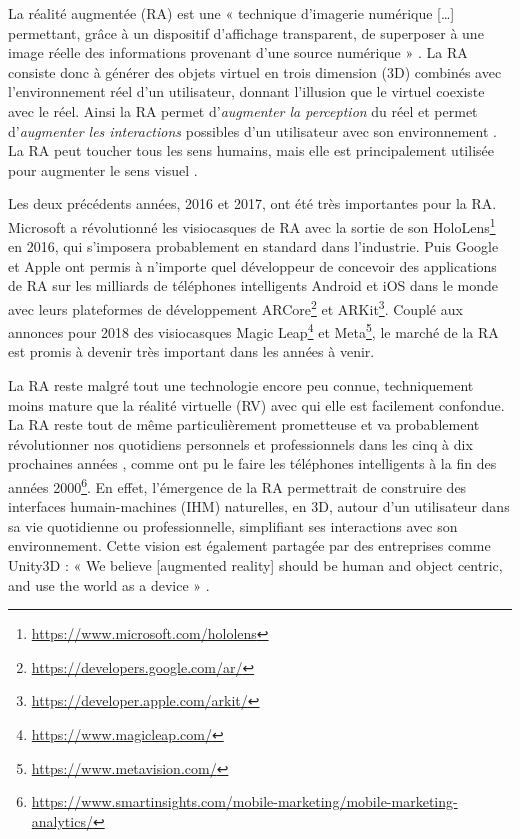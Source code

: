 La réalité augmentée (RA) est une « technique d'imagerie numérique […] permettant, grâce à un dispositif d'affichage transparent, de superposer à une image réelle des informations provenant d'une source numérique » \citep{OfficeQuebecoisLangueFrancaiseRA2015}. La RA consiste donc à générer des objets virtuel en trois dimension (3D) combinés avec l'environnement réel d'un utilisateur, donnant l'illusion que le virtuel coexiste avec le réel. Ainsi la RA permet d'\emph{augmenter la perception} du réel et permet d'\emph{augmenter les interactions} possibles d'un utilisateur avec son environnement \citep{Azuma1997}. La RA peut toucher tous les sens humains, mais elle est principalement utilisée pour augmenter le sens visuel .

Les deux précédents années, 2016 et 2017, ont été très importantes pour la RA. Microsoft a révolutionné les visiocasques de RA avec la sortie de son HoloLens\footnote{\url{https://www.microsoft.com/hololens}} en 2016, qui s'imposera probablement en standard dans l'industrie. Puis Google et Apple ont permis à n'importe quel développeur de concevoir des applications de RA sur les milliards de téléphones intelligents Android et iOS dans le monde avec leurs plateformes de développement ARCore\footnote{\url{https://developers.google.com/ar/}} et ARKit\footnote{\url{https://developer.apple.com/arkit/}}. Couplé aux annonces pour 2018 des visiocasques Magic Leap\footnote{\url{https://www.magicleap.com/}} et Meta\footnote{\url{https://www.metavision.com/}}, le marché de la RA est promis à devenir très important dans les années à venir.


La RA reste malgré tout une technologie encore peu connue, techniquement moins mature que la réalité virtuelle (RV) avec qui elle est facilement confondue. La RA reste tout de même particulièrement prometteuse et va probablement révolutionner nos quotidiens personnels et professionnels dans les cinq à dix prochaines années , comme ont pu le faire les téléphones intelligents à la fin des années 2000\footnote{\url{https://www.smartinsights.com/mobile-marketing/mobile-marketing-analytics/}}. En effet, l'émergence de la RA permettrait de construire des interfaces humain-machines (IHM) naturelles, en 3D, autour d'un utilisateur dans sa vie quotidienne ou professionnelle, simplifiant ses interactions avec son environnement. Cette vision est également partagée par des entreprises comme Unity3D : « We believe [augmented reality] should be human and object centric, and use the world as a device » \citep{UnityFutureMRPartIII2017}.

